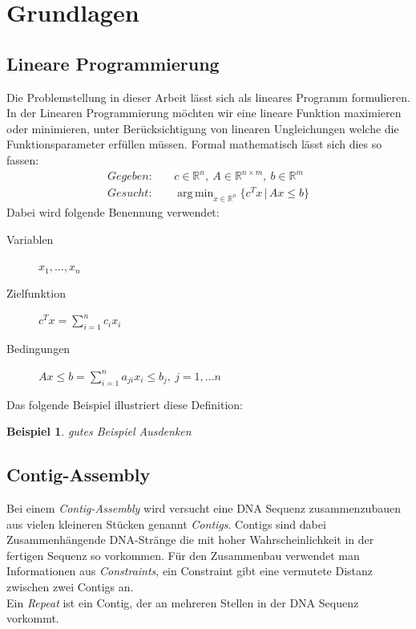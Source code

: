 \documentclass[12pt,ngerman,titlepage,a4paper]{article}
\newtheorem{example}[theorem]{Beispiel}
\DeclareMathOperator*{\argmin}{arg\,min}
\begin{document}
\section{Grundlagen}
\subsection{Lineare Programmierung}

Die Problemstellung in dieser Arbeit lässt sich als lineares Programm formulieren. In der Linearen Programmierung möchten wir eine lineare Funktion maximieren oder minimieren, unter Berücksichtigung von linearen Ungleichungen welche die Funktionsparameter erfüllen müssen.
Formal mathematisch lässt sich dies so fassen:
\begin{align*}
	Gegeben:&\quad c \in \mathbb{R}^{n},\ A \in \mathbb{R}^{n \times m},\ b \in \mathbb{R}^{m} \\
	Gesucht:&\quad \argmin_{ x\in \mathbb{R}^n}\{c^Tx\,|\, Ax \leq b\}
\end{align*}
Dabei wird folgende Benennung verwendet:
\begin{description}
\item[\quad Variablen] $x_1,..., x_n$
\item[\quad Zielfunktion]  $c^Tx = \sum_{i=1}^n c_i x_i$
\item[\quad Bedingungen]  $Ax \leq b = \sum_{i=1}^n a_{ji} x_i \leq b_j, \ j = 1,...n$
\end{description} Das folgende Beispiel illustriert diese Definition:
\begin{example}
	gutes Beispiel Ausdenken
\end{example}

\subsection{Contig-Assembly}
Bei einem \emph{Contig-Assembly} wird versucht eine DNA Sequenz zusammenzubauen aus vielen kleineren Stücken genannt \emph{Contigs}. Contigs sind dabei Zusammenhängende DNA-Stränge die mit hoher Wahrscheinlichkeit in der fertigen Sequenz so vorkommen. Für den Zusammenbau verwendet man Informationen aus \emph{Constraints}, ein Constraint gibt eine vermutete Distanz zwischen zwei Contigs an.\\
Ein \emph{Repeat} ist ein Contig, der an mehreren Stellen in der DNA Sequenz vorkommt.
\end{document}

